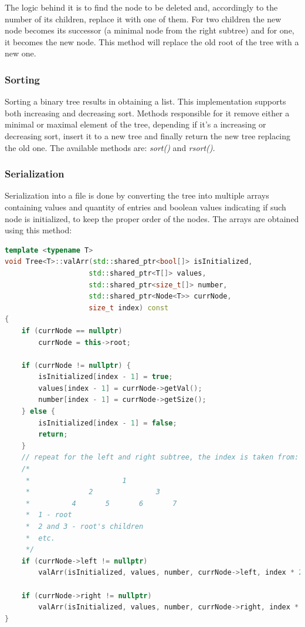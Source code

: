 \documentclass[12pt]{article}
\begin{document}
The logic behind it is to find the node to be deleted and, accordingly to the number of its children, replace it with one of them. For two children the new node becomes its successor (a minimal node from the right subtree) and for one, it becomes the new node. This method will replace the old root of the tree with a new one.

\subsubsection{Sorting}
Sorting a binary tree results in obtaining a list. This implementation supports both increasing and decreasing sort. Methods responsible for it remove either a minimal or maximal element of the tree, depending if it's a increasing or decreasing sort, insert it to a new tree and finally return the new tree replacing the old one. The available methods are: \textit{sort()} and \textit{rsort()}.

\pagebreak
\subsubsection{Serialization}
Serialization into a file is done by converting the tree into multiple arrays containing values and quantity of entries and boolean values indicating if such node is initialized, to keep the proper order of the nodes. The arrays are obtained using this method:
\begin{footnotesize}
\begin{lstlisting}[language=C++]
template <typename T>
void Tree<T>::valArr(std::shared_ptr<bool[]> isInitialized, 
                    std::shared_ptr<T[]> values, 
                    std::shared_ptr<size_t[]> number, 
                    std::shared_ptr<Node<T>> currNode, 
                    size_t index) const
{
    if (currNode == nullptr)
        currNode = this->root;

    if (currNode != nullptr) {                      
        isInitialized[index - 1] = true;
        values[index - 1] = currNode->getVal();
        number[index - 1] = currNode->getSize();
    } else {
        isInitialized[index - 1] = false;
        return;
    }
    // repeat for the left and right subtree, the index is taken from:
    /*
     *                      1
     *              2               3
     *          4       5       6       7
     *  1 - root
     *  2 and 3 - root's children
     *  etc.
     */
    if (currNode->left != nullptr)
        valArr(isInitialized, values, number, currNode->left, index * 2);

    if (currNode->right != nullptr)
        valArr(isInitialized, values, number, currNode->right, index * 2 + 1);
}
\end{lstlisting}
\end{footnotesize}
\end{document}
